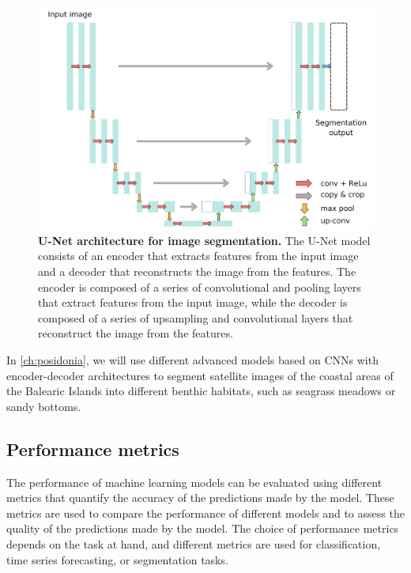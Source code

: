 \begin{figure}[H]
  \centering
  \includegraphics[width=1\textwidth]{Figures/Unet.pdf}
  \caption[U-Net architecture for image segmentation]{
    \textbf{U-Net architecture for image segmentation.} The U-Net model
    consists of an encoder that extracts features from the input image and a
    decoder that reconstructs the image from the features. The encoder is
    composed of a series of convolutional and pooling layers that extract
    features from the input image, while the decoder is composed of a series
    of
    upsampling and convolutional layers that reconstruct the image from the
    features.}
  \label{fig:Unet}
\end{figure}

In \cref{ch:posidonia}, we will use different advanced models based on CNNs
with encoder-decoder architectures to segment satellite images of the coastal
areas of the Balearic Islands into different benthic habitats, such as
seagrass meadows or sandy bottoms.

\subsection{Performance metrics}

The performance of machine learning models can be evaluated using different
metrics that quantify the accuracy of the predictions made by the model.
These
metrics are used to compare the performance of different models and to assess
the quality of the predictions made by the model. The choice of performance
metrics depends on the task at hand, and different metrics are used for
classification, time series forecasting, or segmentation tasks.

